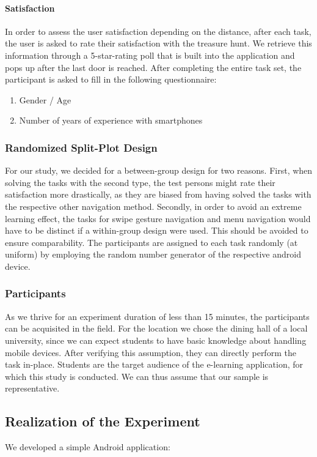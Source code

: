 \documentclass{sig-alternate-05-2015}
\begin{document}
\paragraph{Satisfaction}
In order to assess the user satisfaction depending on the distance, after each task, the user is asked to rate their
satisfaction with the treasure hunt. We retrieve this information through a 5-star-rating poll that is built into the application and pops
up after the last door is reached.
After completing the entire task set, the participant is asked to fill in the following questionnaire:
\begin{enumerate}
  \item Gender / Age
  \item Number of years of experience with smartphones
\end{enumerate}

\subsubsection{Randomized Split-Plot Design}
For our study, we decided for a between-group design for two reasons.
First, when solving the tasks with the second type, the test persons might rate their satisfaction more drastically, as they
are biased from having solved the tasks with the respective other navigation method.
Secondly, in order to avoid an extreme learning effect, the tasks for swipe gesture navigation and menu navigation
would have to be distinct if a within-group design were used. This should be avoided to ensure comparability.
The participants are assigned to each task randomly (at uniform) by
employing the random number generator of the respective android device.

\subsubsection{Participants}
As we thrive for an experiment duration of less than 15 minutes,
the participants can be acquisited in the field.
For the location we chose the dining hall of a local university,
since we can expect students to have basic knowledge about handling mobile devices.
After verifying this assumption, they can directly perform the task in-place.
Students are the target audience of the e-learning application,
for which this study is conducted.
We can thus assume that our sample is representative.
\subsection{Realization of the Experiment}
We developed a simple Android application:
\end{document}
